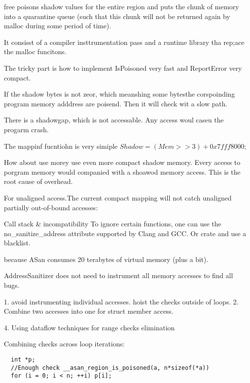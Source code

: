 free poisons shadow values for the entire region and puts the chunk of memory into a quarantine queue (such that this chunk will not be returned again by malloc during some period of time).


It consisst of a compiler insttrumentation pass and
a runtime library tha rep;ace the malloc funcitons.

The tricky part is how to implement IsPoisoned very fast and ReportError very compact.

If the shadow bytes is not zeor, which meanshing some bytesthe corspoinding program memory adddress
are poisend. Then it will check wit a slow path.

There is a shadowgap, which is not accessable.
Any access woul caseu the progarm crash.

The mappinf fucntiohn is very simiple
$Shadow = (Mem >> 3) + 0x7fff8000;$

How about use morey use even more compact shadow memory.
Every access to porgram memory would companied with a shoawod memory access.
This is the root cause of overhead.

For unaligned access.The current compact mapping will not catch unaligned partially out-of-bound accesses:



Call stack & incompatibility
To ignore certain functions, one can use the no_sanitize_address attribute
supported by Clang and GCC.
Or crate and use a blacklist.

because ASan consumes 20 terabytes of virtual memory (plus a bit).


AddressSanitizer does not need to instrument all memory accesses to find all bugs.

1. avoid instrumenting individual accesses. hoist the checks outside of loops.
2. Combine two accesses into one for struct member access.

4. Using dataflow techniques for range checks elimination

Combining checks across loop iterations:

\begin{verbatim}
  int *p;
  //Enough check __asan_region_is_poisoned(a, n*sizeof(*a))
  for (i = 0; i < n; ++i) p[i];
\end{verbatim}

